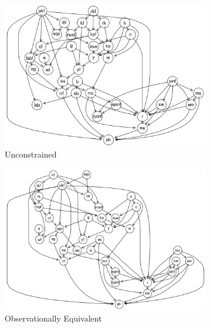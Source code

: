\documentclass{article}
\begin{document}
\begin{figure}

    \centering
    \begin{subfigure}{0.3\textwidth}
      \centering
      \includegraphics[width=\linewidth]{images/sw_init.png} 
      \caption{Unconstrained}
      \label{init}
    \end{subfigure}
    \begin{subfigure}{0.3\textwidth}
      \centering  
      \includegraphics[width=\linewidth]{images/sw_equiv.png}
      \caption{Observationally Equivalent}
      \label{equiv}
    \end{subfigure}
    \begin{subfigure}{0.3\textwidth}
      \centering  

\end{subfigure}
\end{figure}
\end{document}
